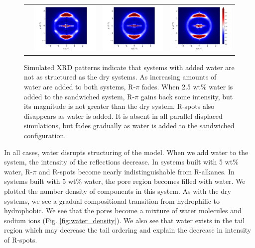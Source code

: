 \documentclass[journal=jpcbfk,manusciprt=article]{achemso}
\begin{document}
\begin{figure}
\begin{tabular}{@{}c@{ }c@{ }c@{ }c@{}}
  	\rowname{Sandwiched}&
  	\includegraphics[width=.28\linewidth,trim={1cm 0 1.3cm 0},clip]{solvated_layered_rzplot_1.png}&
  	\includegraphics[width=.28\linewidth,trim={1cm 0 1.3cm 0},clip]{solvated_layered_rzplot_25.png}&
  	\includegraphics[width=.325\linewidth]{solvated_layered_rzplot_5.png}\\[-1ex]
  	\end{tabular}
	\caption{Simulated XRD patterns indicate that systems with added water
		are not as structured as the dry systems. As increasing amounts of water are 
		added to both systems, R-$\pi$ fades. When 2.5 wt\% water is added to the
		sandwiched system, R-$\pi$ gains back some intensity, but its magnitude is not
		greater than the dry system. R-spots also disappears as water is added. It is
		absent in all parallel displaced simulations, but fades gradually as water is
		added to the sandwiched configuration.}%
  \label{fig:solvation}

  \end{figure}
 
  In all cases, water disrupts structuring of the model. When we add water to
  the system, the intensity of the reflections decrease. In systems built with 5
  wt\% water, R-$\pi$ and R-spots become nearly indistinguishable from R-alkanes.
  In systems built with 5 wt\% water, the pore region becomes filled with
  water. We plotted the number density of components in this system. As with the 
  dry systems, we see a gradual compositional transition from hydrophilic to hydrophobic.  
  We see that the pores become a mixture of water molecules and sodium ions (Fig.
  \ref{fig:water_density}). We also see that water exists in the tail region which 
  may decrease the tail ordering and explain the decrease in intensity of R-spots.
  
\end{document}
